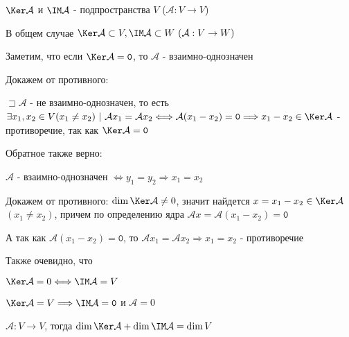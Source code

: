 \documentclass[12pt]{article}
\begin{document}
    \Notas $\Ker \mathcal{A}$ и $\IM \mathcal{A}$ - подпространства $V$ ($\mathcal{A} : V \rightarrow V$)

    В общем случае $\Ker \mathcal{A} \subset V, \IM \mathcal{A} \subset W \ (\mathcal{A} : V \rightarrow W)$

    \mediumvspace

    Заметим, что если $\Ker \mathcal{A} = \texttt{0}$, то $\mathcal{A}$ - взаимно-однозначен

    \begin{MyProof}
        Докажем от противного:

        $\sqsupset \mathcal{A}$ - не взаимно-однозначен, то есть 
        $\exists x_1, x_2 \in V (x_1 \neq x_2) \ | \ \mathcal{A}x_1 = \mathcal{A}x_2 \Longleftrightarrow 
        \mathcal{A} (x_1 - x_2) = \texttt{0} \Longrightarrow x_1 - x_2 \in \Ker \mathcal{A}$ - 
        противоречие, так как $\Ker \mathcal{A} = \texttt{0}$
    \end{MyProof}

    \Notas Обратное также верно:

    \begin{MyProof}
        $\mathcal{A}$ - взаимно-однозначен $\Longleftrightarrow y_1 = y_2 \Longrightarrow x_1 = x_2$

        Докажем от противного: $\dim \Ker \mathcal{A} \neq 0$, значит найдется $x = x_1 - x_2 \in \Ker \mathcal{A}$ $(x_1 \neq x_2)$, 
        причем по определению ядра $\mathcal{A} x = \mathcal{A} (x_1 - x_2) = \texttt{0}$

        А так как $\mathcal{A} (x_1 - x_2) = \texttt{0}$, то $\mathcal{A} x_1 = \mathcal{A} x_2 \Longrightarrow x_1 = x_2$ - противоречие
    \end{MyProof}

    \Nota Также очевидно, что

    $\Ker \mathcal{A} = 0 \Longleftrightarrow \IM \mathcal{A} = V$

    $\Ker \mathcal{A} = V \Longrightarrow \IM \mathcal{A} = \texttt{0}$ и $\mathcal{A} = 0$

    \hypertarget{theoremaboutdimensions}{}

    \begin{MyTheorem}
        \Ths $\mathcal{A} : V \rightarrow V$, тогда $\dim \Ker \mathcal{A} + \dim \IM \mathcal{A} = \dim V$
    \end{MyTheorem}
\end{document}
